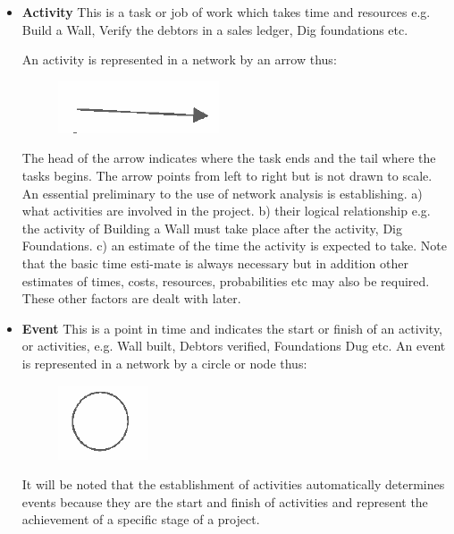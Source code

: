\documentclass[]{report}
\begin{document}
\begin{itemize}
	\item 
\textbf{Activity} This is a task or job of work which takes time and resources e.g. Build a Wall, Verify the debtors in a sales ledger, Dig foundations etc. 

An activity is represented in a network by an arrow thus: 
\begin{figure}[h!]
\centering
\includegraphics[width=0.15\linewidth]{323-a}
\end{figure}

The head of the arrow indicates where the task ends and the tail where the tasks begins. The arrow points from left to right but is not drawn to scale. An essential preliminary to the use of network analysis is establishing. a) what activities are involved in the project. b) their logical relationship e.g. the activity of Building a Wall must take place after the activity, Dig Foundations. c) an estimate of the time the activity is expected to take. Note that the basic time esti-mate is always necessary but in addition other estimates of times, costs, resources, probabilities etc may also be required. These other factors are dealt with later. 
\item \textbf{Event} This is a point in time and indicates the start or finish of an activity, or activities, e.g. Wall built, Debtors verified, Foundations Dug etc. An event is represented in a network by a circle or node thus: \begin{figure}[h!]
\centering
\includegraphics[width=0.1\linewidth]{323-b}
\end{figure}

It will be noted that the establishment of activities automatically determines events because they are the start and finish of activities and represent the achievement of a specific stage of a project. 


\end{itemize}
\end{document}
